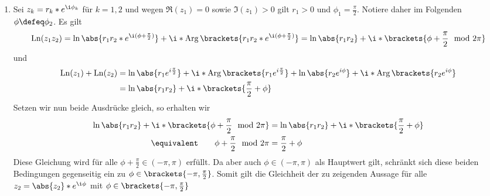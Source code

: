 \begin{exercisePage}
\begin{enumerate}[label=(zu \alph*), leftmargin=*]
		\item Sei $z_k = r_k * e^{\i \phi_k}$ für $k = 1,2$ und wegen $\Re(z_1) = 0$ sowie $\Im(z_1) > 0$ gilt $r_1 > 0$ und $\phi_1 = \frac{\pi}{2}$. Notiere daher im Folgenden $\phi \defeq \phi_2$. Es gilt
		\begin{equation*}
			\Ln(z_1 z_2) = \ln{\abs{r_1 r_2 * e^{\i (\phi + \frac{\pi}{2})}}} + \i * \Arg\brackets{r_1 r_2 * e^{\i (\phi + \frac{\pi}{2})}} = \ln \abs{r_1 r_2} + \i * \brackets{\phi + \frac{\pi}{2} \mod 2\pi}
		\end{equation*}
		und 
		\begin{equation*}
		\begin{aligned}
				\Ln(z_1) + \Ln(z_2) &= \ln\abs{r_1 e^{i \frac{\pi}{2}}} + \i * \Arg\brackets{r_1 e^{i \frac{\pi}{2}}} + \ln\abs{r_2 e^{i \phi}} + \i * \Arg\brackets{r_2 e^{i \phi}} \\
				&= \ln\abs{r_1 r_2} + \i * \brackets{\frac{\pi}{2} + \phi}
		\end{aligned}
		\end{equation*}
		Setzen wir nun beide Ausdrücke gleich, so erhalten wir
		\begin{equation*}
			\begin{aligned}
			\ln \abs{r_1 r_2} + \i * \brackets{\phi + \frac{\pi}{2} \mod 2\pi} &= \ln\abs{r_1 r_2} + \i * \brackets{\frac{\pi}{2} + \phi} \\
			\equivalent \qquad \phi + \frac{\pi}{2} \mod 2\pi &= \frac{\pi}{2} + \phi
			\end{aligned}
		\end{equation*}
		Diese Gleichung wird für alle $\phi + \frac{\pi}{2} \in (-\pi, \pi)$ erfüllt. Da aber auch $\phi \in (-\pi, \pi)$ als Hauptwert gilt, schränkt sich diese beiden Bedingungen gegenseitig ein zu $\phi \in \brackets{-\pi, \frac{\pi}{2}}$. Somit gilt die Gleichheit der zu zeigenden Aussage für alle $z_2 = \abs{z_2} * e^{\i \phi}$ mit $\phi \in \brackets{-\pi, \frac{\pi}{2}}$
	\end{enumerate}
\end{exercisePage}